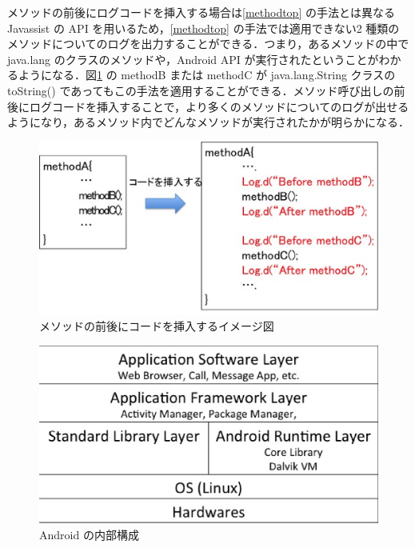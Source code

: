 メソッドの前後にログコードを挿入する場合は\ref{methodtop} の手法とは異なる Javassist の API を用いるため，\ref{methodtop} の手法では適用できない2 種類のメソッドについてのログを出力することができる．つまり，あるメソッドの中で java.lang のクラスのメソッドや，Android API が実行されたということがわかるようになる．図\ref{insertbetw} の methodB または methodC が java.lang.String  クラスの toString() であってもこの手法を適用することができる．メソッド呼び出しの前後にログコードを挿入することで，より多くのメソッドについてのログが出せるようになり，あるメソッド内でどんなメソッドが実行されたかが明らかになる．

\begin{figure}[t]
\begin{center}
\includegraphics[scale=0.35]{image4.eps}
\end{center}
\caption{メソッドの前後にコードを挿入するイメージ図}
\label{insertbetw}
\end{figure}

\begin{figure}[t]
\begin{center}
\includegraphics[scale=0.5]{structure2.eps}
\end{center}
\caption{Android の内部構成}
\label{structure}
\end{figure}

